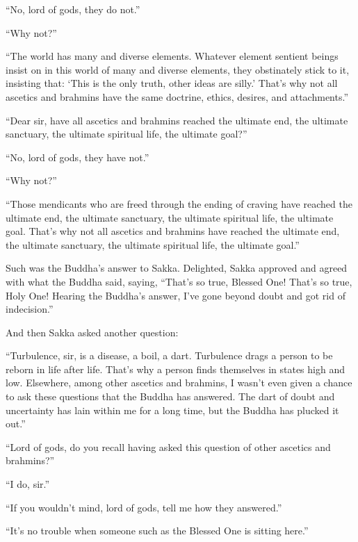 \documentclass[12pt,openany]{book}%
\begin{document}
“No, lord of gods, they do not.” 

“Why not?” 

“The world has many and diverse elements. Whatever element sentient beings insist on in this world of many and diverse elements, they obstinately stick to it, insisting that: ‘This is the only truth, other ideas are silly.’ That’s why not all ascetics and brahmins have the same doctrine, ethics, desires, and attachments.” 

“Dear sir, have all ascetics and brahmins reached the ultimate end, the ultimate sanctuary, the ultimate spiritual life, the ultimate goal?” 

“No, lord of gods, they have not.” 

“Why not?” 

“Those mendicants who are freed through the ending of craving have reached the ultimate end, the ultimate sanctuary, the ultimate spiritual life, the ultimate goal. That’s why not all ascetics and brahmins have reached the ultimate end, the ultimate sanctuary, the ultimate spiritual life, the ultimate goal.” 

Such was the Buddha’s answer to Sakka. Delighted, Sakka approved and agreed with what the Buddha said, saying, “That’s so true, Blessed One! That’s so true, Holy One! Hearing the Buddha’s answer, I’ve gone beyond doubt and got rid of indecision.” 

And then Sakka asked another question: 

“Turbulence, sir, is a disease, a boil, a dart. Turbulence drags a person to be reborn in life after life. That’s why a person finds themselves in states high and low. Elsewhere, among other ascetics and brahmins, I wasn’t even given a chance to ask these questions that the Buddha has answered. The dart of doubt and uncertainty has lain within me for a long time, but the Buddha has plucked it out.” 

“Lord of gods, do you recall having asked this question of other ascetics and brahmins?” 

“I do, sir.” 

“If you wouldn’t mind, lord of gods, tell me how they answered.” 

“It’s no trouble when someone such as the Blessed One is sitting here.” 
\end{document}
